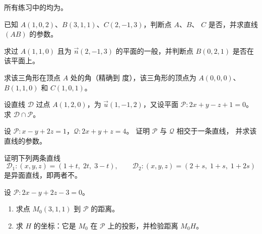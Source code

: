 所有练习中的均为。

\begin{exercise}[$\star$]\label{exo:g12:space:1}
已知 $A(1, 0, 2)$、$B(3, 1, 1)$、$C(2, -1, 3)$，判断点 $A$、$B$、
$C$ 是否，并求直线 $(AB)$ 的参数。
\end{exercise}

\begin{exercise}[$\star$]\label{exo:g12:space:2}
求过 $A(1, 1, 0)$ 且为
$\vec n(2, -1, 3)$ 的平面的一般，并判断点 $B(0, 2, 1)$ 是否在该平面上。
\end{exercise}

\begin{exercise}[$\star$]\label{exo:g12:space:3}
求该三角形在顶点 $A$ 处的角（精确到
度），该三角形的顶点为 $A(0,0,0)$、$B(1, 1, 0)$ 和 $C(1, 0, 1)$。
\end{exercise}

\begin{exercise}[$\star\star$]\label{exo:g12:space:4}
设直线 $\mathcal D$ 过点 $A(1, 2, 0)$，为
$\vec u(1, -1, 2)$，又设平面 $\mathcal P : 2x + y - z + 1 = 0$。
求 $\mathcal D \cap \mathcal P$。
\end{exercise}

\begin{exercise}[$\star\star$]\label{exo:g12:space:5}
设 $\mathcal P : x - y + 2z = 1$，$\mathcal Q : 2x + y + z = 4$。
证明 $\mathcal P$ 与 $\mathcal Q$ 相交于一条直线，
并求该直线的参数。
\end{exercise}

\begin{exercise}[$\star\star$]\label{exo:g12:space:6}
证明下列两条直线
\[
\mathcal D_1 : (x, y, z) = (1 + t,\; 2t,\; 3 - t), \qquad
\mathcal D_2 : (x, y, z) = (2 + s,\; 1 + s,\; 1 + 2s)
\]
是异面直线，即两者不。
\end{exercise}

\begin{exercise}[$\star\star$]\label{exo:g12:space:7}
设 $\mathcal P : 2x - y + 2z - 3 = 0$。
\begin{enumerate}
  \item 求点 $M_0(3, 1, 1)$ 到 $\mathcal P$ 的距离。
  \item 求 $H$ 的坐标：它是
        $M_0$ 在 $\mathcal P$ 上的投影，并检验距离 $M_0H$。
\end{enumerate}
\end{exercise}

